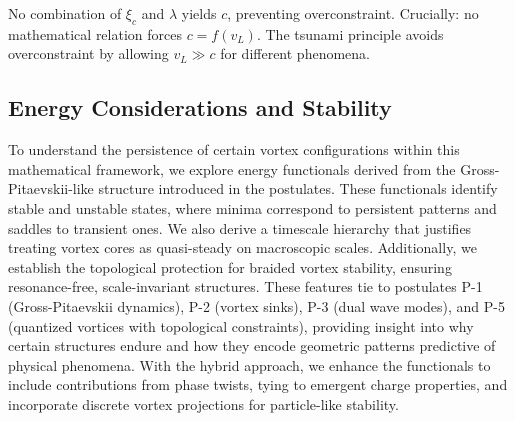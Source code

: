 No combination of $\xi_c$ and $\lambda$ yields $c$, preventing overconstraint. Crucially: no mathematical relation forces $c = f(v_L)$. The tsunami principle avoids overconstraint by allowing $v_L \gg c$ for different phenomena.

\medskip
\noindent
{}
\medskip

\subsection{Energy Considerations and Stability}

To understand the persistence of certain vortex configurations within this mathematical framework, we explore energy functionals derived from the Gross-Pitaevskii-like structure introduced in the postulates. These functionals identify stable and unstable states, where minima correspond to persistent patterns and saddles to transient ones. We also derive a timescale hierarchy that justifies treating vortex cores as quasi-steady on macroscopic scales. Additionally, we establish the topological protection for braided vortex stability, ensuring resonance-free, scale-invariant structures. These features tie to postulates P-1 (Gross-Pitaevskii dynamics), P-2 (vortex sinks), P-3 (dual wave modes), and P-5 (quantized vortices with topological constraints), providing insight into why certain structures endure and how they encode geometric patterns predictive of physical phenomena. With the hybrid approach, we enhance the functionals to include contributions from phase twists, tying to emergent charge properties, and incorporate discrete vortex projections for particle-like stability.

